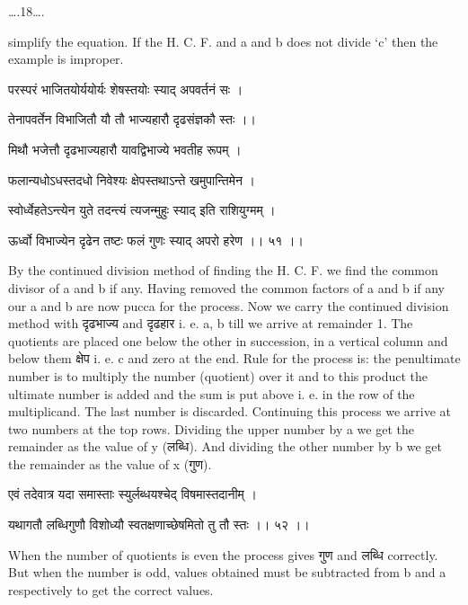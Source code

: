 \documentclass[]{article}
\date{}
\begin{document}
{\ldots{}.18\ldots{}.}

{simplify the equation. If the H. C. F. and a and b does not divide `c'
then the example is improper.}

{परस्परं भाजितयोर्ययोर्यः शेषस्तयोः स्याद् अपवर्तनं सः । }

{तेनापवर्तेन विभाजितौ यौ तौ भाज्यहारौ दृढसंज्ञकौ स्तः ।। }

{मिथौ भजेत्तौ दृढभाज्यहारौ यावद्विभाज्ये भवतीह रूपम् । }

{फलान्यधोऽधस्तदधो निवेश्यः क्षेपस्तथाऽन्ते खमुपान्तिमेन । }

{स्वोर्ध्वेहतेऽन्त्येन युते तदन्त्यं त्यजन्मुहुः स्याद् इति राशियुग्मम्
। }

{ऊर्ध्वो विभाज्येन दृढेन तष्टः फलं गुणः स्याद् अपरो हरेण ।। ५१ ।। }

{By the continued division method of finding the H. C. F. we find the
common divisor of a and b if any. Having removed the common factors of a
and b if any our a and b are now pucca for the process. Now we carry the
continued division method with दृढभाज्य and दृढहार i. e. a, b till we
arrive at remainder 1. The quotients are placed one below the other in
succession, in a vertical column and below them क्षेप i. e. c and zero
at the end. Rule for the process is: the penultimate number is to
multiply the number (quotient) over it and to this product the ultimate
number is added and the sum is put above i. e. in the row of the
multiplicand. The last number is discarded. Continuing this process we
arrive at two numbers at the top rows. Dividing the upper number by a we
get the remainder as the value of y (लब्धि). And dividing the other
number by b we get the remainder as the value of x (गुण).}

{एवं तदेवात्र यदा समास्ताः स्युर्लब्धयश्चेद् विषमास्तदानीम् । }

{यथागतौ लब्धिगुणौ विशोध्यौ स्वतक्षणाच्छेषमितो तु तौ स्तः ।। ५२ ।। }

{When the number of quotients is even the process gives गुण and लब्धि
correctly. But when the number is odd, values obtained must be
subtracted from b and a respectively to get the correct values.}
\end{document}
